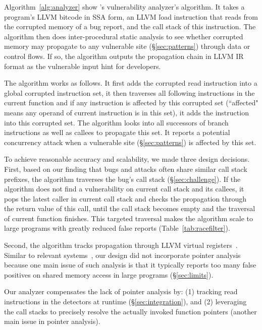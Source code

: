 Algorithm~\ref{alg:analyzer} show \xxx's vulnerability analyzer's
algorithm. It takes a program's LLVM bitcode in SSA form, an LLVM \v{load} 
instruction that reads from the corrupted memory of a bug report, and the call 
stack of this instruction. The algorithm then does inter-procedural static 
analysis to see whether corrupted memory may propagate to any vulnerable 
site (\S\ref{sec:patterns}) through data or control flows. If so, the algorithm 
outputs the propagation chain in LLVM IR format as the vulnerable input hint 
for developers.

The algorithm works as follows. It first adds the corrupted read
instruction into a global corrupted instruction set, it then traverses all
following instructions in the current function and if any instruction is affected
by this corrupted set (``affected" means any operand of current instruction
is in this set), it adds the instruction into this corrupted set.
The algorithm looks into all successors of branch instructions as well as
callees to propagate this set. It reports a potential concurrency attack when a
vulnerable site (\S\ref{sec:patterns}) is affected by this set.

To achieve reasonable accuracy and scalability, we made three design decisions. 
First, based on our finding that bugs and attacks often share similar call 
stack prefixes, the algorithm traverses the bug's call stack 
(\S\ref{sec:challenge}). If the algorithm does not find a vulnerability on 
current call stack and its callees, it pops the latest caller in current call 
stack and checks the propagation through the return value of this call, until 
the call stack becomes empty and the traversal of current function finishes. 
This targeted traversal makes the algorithm scale to large programs with 
greatly reduced false reports (Table~\ref{tab:racefilter}).
 
Second, the algorithm tracks propagation through LLVM virtual 
registers~\cite{llvm}. Similar to relevant
systems~\cite{conseq:asplos11,gist:sosp15}, our 
design did not incorporate pointer analysis~\cite{bddbddb, dsa:pldi07} 
because one main issue of such analysis is that it typically reports
too many false positives on shared memory access in large programs
(\S\ref{sec:limits}).

Our analyzer compensates the lack of pointer analysis by:
(1) tracking read instructions in the detectors at runtime 
(\S\ref{sec:integration}), and (2) leveraging the call stacks to precisely 
resolve the actually invoked function pointers (another main issue in pointer 
analysis).

